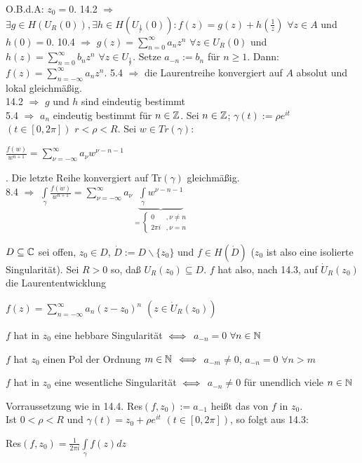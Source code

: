 \documentclass[a4paper,twoside,DIV15,BCOR12mm]{scrbook}
\def\gdw{\equizu}
\def\gdw{\equizu}
\begin{document}
\begin{beweis}
O.B.d.A: $z_0 = 0$. 14.2 $\Rightarrow$ $\exists g \in H(U_R(0)), \exists h \in
H(U_{\frac{1}{r}}(0)): f(z) = g(z) + h(\frac{1}{z})$ $\forall z \in A$ und $h(0)
= 0.$ 10.4 $\Rightarrow$ $g(z) = \sum\limits_{n=0}^{\infty} a_n z^n$
$\forall z \in U_R(0)$ und $h(z) = \sum\limits_{n=0}^{\infty} b_n z^n$
$\forall z \in U_{\frac{1}{r}}$. Setze $a_{-n} := b_n$ für $n \geq 1$. Dann: 
$f(z) = \sum\limits_{n=-\infty}^{\infty} a_n z^n$. 5.4 $\Rightarrow$ die
Laurentreihe konvergiert auf $A$ absolut und lokal gleichmäßig. \\
14.2 $\Rightarrow$ $g$ und $h$ sind eindeutig bestimmt \\ 5.4 $\Rightarrow$
$a_n$ eindeutig bestimmt für $n \in \mathbb{Z}$. Sei $n \in \mathbb{Z}$; $\gamma(t) := \rho
e^{it}$ $(t \in [0, 2 \pi])$ $r<\rho <R$. Sei $w \in Tr(\gamma)$: \\
\centerline{$\frac{f(w)}{w^{n+1}} = \sum\limits_{\nu=-\infty}^{\infty} a_\nu w^{\nu - n -1}$}.
Die letzte Reihe konvergiert auf Tr$(\gamma)$ gleichmäßig. \\
8.4 $\Rightarrow$ $\int\limits_{\gamma} \frac{f(w)}{w^{n+1}}= \sum\limits_{\nu=-\infty}^{\infty} a_\nu
\underbrace{\int\limits_{\gamma} w^{\nu -n -1}}_{
= \begin{cases} 0 &, \nu \neq n \\
  				2 \pi i & , \nu = n
  \end{cases}}$
\end{beweis}
\begin{satz}
$D \subseteq \mathbb{C}$ sei offen, $z_0 \in D$, $\dot{D} := D \backslash \{ z_0 \}$
und $f \in H(\dot{D})$ ($z_0$ ist also eine isolierte Singularität). Sei $R > 0$
so, daß $U_R(z_0) \subseteq D$. $f$ hat also, nach 14.3, auf $\dot{U}_R(z_0)$ die
Laurententwicklung \\
\centerline{$f(z) = \sum\limits_{n=-\infty}^{\infty} a_n(z-z_0)^n$ $(z \in
\dot{U}_R(z_0))$} 
\begin{liste}
\item $f$ hat in $z_0$ eine hebbare Singularität $\gdw$ $a_{-n} = 0$ $\forall n
\in \mathbb{N}$
\item $f$ hat $z_0$ einen Pol der Ordnung $m \in \mathbb{N}$ $\gdw$ $a_{-m} \neq 0$, 
$a_{-n} = 0$ $\forall n > m$
\item $f$ hat in $z_0$ eine wesentliche Singularität $\gdw$ $a_{-n} \neq 0$ für
unendlich viele $n \in \mathbb{N}$
\end{liste}
\end{satz}

\begin{definition}
Vorraussetzung wie in 14.4. Res$(f, z_0) := a_{-1}$ heißt das 
von $f$ in $z_0$. \\
Ist $0 < \rho < R$ und $\gamma(t) = z_0 + \rho e ^{it}$ $( t \in [0, 2 \pi])$,
so folgt aus 14.3: \\ \centerline{Res$(f, z_0) = \frac{1}{2\pi i} \int\limits_{\gamma} f(z)
dz$}
\end{definition}
\end{document}
